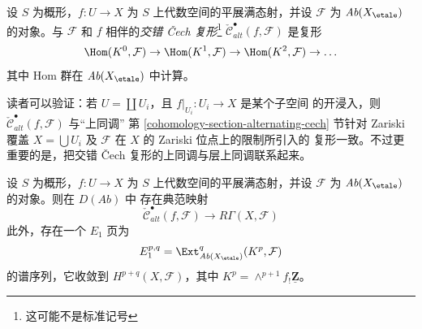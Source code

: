 \begin{definition}
\label{definition-alternating-cech-complex}
设 $S$ 为概形，$f : U \to X$ 为 $S$ 上代数空间的平展满态射，并设
$\mathcal{F}$ 为 $\textit{Ab}(X_\etale)$ 的对象。与 $\mathcal{F}$ 和 $f$
相伴的{\it 交错 {\v C}ech 复形}\footnote{这可能不是标准记号}
$\check{\mathcal{C}}^\bullet_{alt}(f, \mathcal{F})$ 是复形
$$
\Hom(K^0, \mathcal{F}) \to \Hom(K^1, \mathcal{F}) \to
\Hom(K^2, \mathcal{F}) \to \ldots
$$
其中 Hom 群在 $\textit{Ab}(X_\etale)$ 中计算。
\end{definition}

\noindent
读者可以验证：若 $U = \coprod U_i$，且 $f|_{U_i} : U_i \to X$ 是某个子空间
的开浸入，则 $\check{\mathcal{C}}_{alt}^\bullet(f, \mathcal{F})$ 与“上同调”
第 \ref{cohomology-section-alternating-cech} 节针对 Zariski 覆盖
$X = \bigcup U_i$ 及 $\mathcal{F}$ 在 $X$ 的 Zariski 位点上的限制所引入的
复形一致。不过更重要的是，把交错 {\v C}ech 复形的上同调与层上同调联系起来。

\begin{lemma}
\label{lemma-alternating-cech-to-cohomology}
设 $S$ 为概形，$f : U \to X$ 为 $S$ 上代数空间的平展满态射，并设
$\mathcal{F}$ 为 $\textit{Ab}(X_\etale)$ 的对象。则在 $D(\textit{Ab})$ 中
存在典范映射
$$
\check{\mathcal{C}}^\bullet_{alt}(f, \mathcal{F})
\longrightarrow
R\Gamma(X, \mathcal{F})
$$
此外，存在一个 $E_1$ 页为
$$
E_1^{p, q} =
\Ext_{\textit{Ab}(X_\etale)}^q(K^p, \mathcal{F})
$$
的谱序列，它收敛到 $H^{p + q}(X, \mathcal{F})$，其中
$K^p = \wedge^{p + 1}f_!\underline{\mathbf{Z}}$。
\end{lemma}

